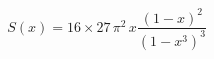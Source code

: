 \begin{equation}
S(x)=16 \times 27\,\pi^2\,x\frac{\left(1-x\right)^{2}}{\left(1-x^3
\right)^3} \label{S1}
\end{equation}

